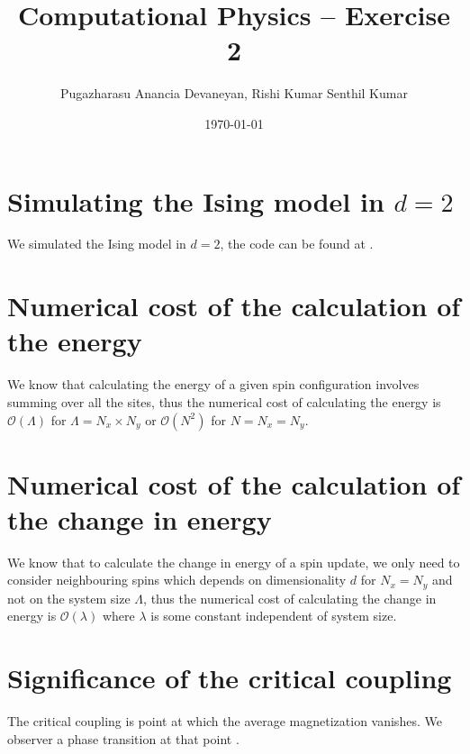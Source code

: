 \documentclass{cernatsnote}
\title{Computational Physics – Exercise 2}
\author{Pugazharasu Anancia Devaneyan, Rishi Kumar Senthil Kumar}
\date{\today}
\begin{document}
\maketitle



\section{Simulating the Ising model in $d=2$}
We simulated the Ising model in $d=2$, the code can be found at \cite{github}.

\section{Numerical cost of the calculation of the energy}
We know that calculating the energy of a given spin configuration involves summing over all the sites, thus the numerical cost of calculating the energy is  $\mathcal{O}(\Lambda)$ for $\Lambda = N_{x} \times N_{y}$ or $\mathcal{O}(N^{2})$ for $N = N_{x} = N_{y}$.
\section{Numerical cost of the calculation of the change in energy}
We know that to calculate the change in energy of a spin update, we only need to consider neighbouring spins which depends on dimensionality $d$ for $N_{x} = N_{y}$ and not on the system size $\Lambda$, thus the numerical cost of calculating the change in energy is  $\mathcal{O}(\lambda)$ where $\lambda$ is some constant independent of system size.
\section{Significance of the critical coupling}
The critical coupling is point at which the average magnetization vanishes. We observer a phase transition at that point \cite{thijssen}.
\end{document}
